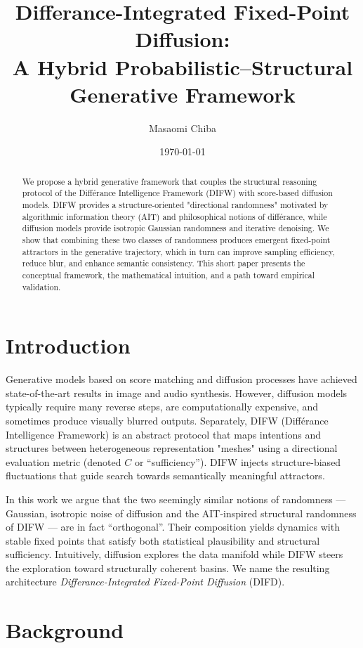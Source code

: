 \documentclass[11pt]{article}
\title{Differance-Integrated Fixed-Point Diffusion: \\
A Hybrid Probabilistic–Structural Generative Framework}
\author[1]{Masaomi Chiba}
\affil[1]{Independent Researcher / DIFW Lab}
\date{\today}
\begin{document}
\maketitle

\begin{abstract}
We propose a hybrid generative framework that couples the structural reasoning protocol of the
Différance Intelligence Framework (DIFW) with score-based diffusion models. DIFW provides a
structure-oriented "directional randomness" motivated by algorithmic information theory (AIT)
and philosophical notions of différance, while diffusion models provide isotropic Gaussian
randomness and iterative denoising. We show that combining these two classes of randomness
produces emergent fixed-point attractors in the generative trajectory, which in turn can
improve sampling efficiency, reduce blur, and enhance semantic consistency. This short paper
presents the conceptual framework, the mathematical intuition, and a path toward empirical
validation.
\end{abstract}

\section{Introduction}
Generative models based on score matching and diffusion processes have achieved state-of-the-art
results in image and audio synthesis. However, diffusion models typically require many reverse
steps, are computationally expensive, and sometimes produce visually blurred outputs. Separately,
DIFW (Différance Intelligence Framework) is an abstract protocol that maps intentions and
structures between heterogeneous representation "meshes" using a directional evaluation metric
(denoted $C$ or ``sufficiency''). DIFW injects structure-biased fluctuations that guide search
towards semantically meaningful attractors.

In this work we argue that the two seemingly similar notions of randomness --- Gaussian,
isotropic noise of diffusion and the AIT-inspired structural randomness of DIFW --- are in fact
“orthogonal”. Their composition yields dynamics with stable fixed points that satisfy both
statistical plausibility and structural sufficiency. Intuitively, diffusion explores the data
manifold while DIFW steers the exploration toward structurally coherent basins. We name the
resulting architecture \emph{Differance-Integrated Fixed-Point Diffusion} (DIFD).

\section{Background}
\end{document}
